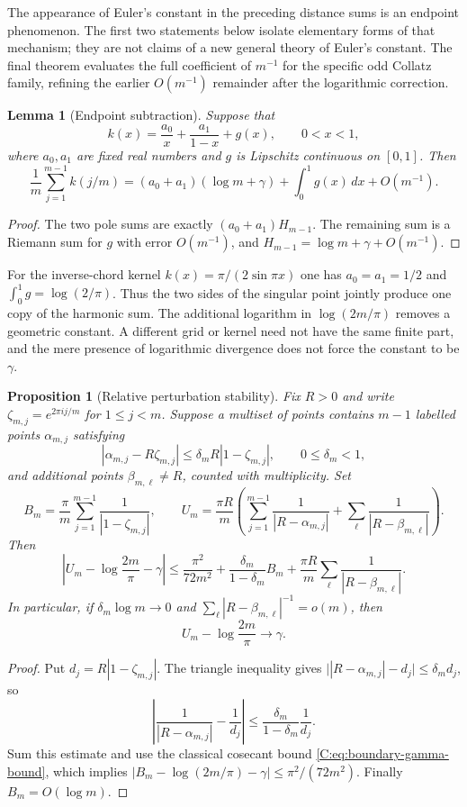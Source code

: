 \documentclass[11pt,a4paper]{article}
\newtheorem{lemma}[theorem]{Lemma}
\newtheorem{proposition}[theorem]{Proposition}
\theoremstyle{definition}
\theoremstyle{remark}
\numberwithin{equation}{section}
\begin{document}
The appearance of Euler's constant in the preceding distance sums is an
endpoint phenomenon.  The first two statements below isolate elementary
forms of that mechanism; they are not claims of a new general theory of
Euler's constant.  The final theorem evaluates the full coefficient of
$m^{-1}$ for the specific odd Collatz family, refining the earlier
$O(m^{-1})$ remainder after the logarithmic correction.

\begin{lemma}[Endpoint subtraction]
\label{C:lem:endpoint-subtraction-general}
Suppose that
\[
 k(x)=\frac{a_0}{x}+\frac{a_1}{1-x}+g(x),\qquad 0<x<1,
\]
where $a_0,a_1$ are fixed real numbers and $g$ is Lipschitz continuous on
$[0,1]$.  Then
\[
 \frac1m\sum_{j=1}^{m-1}k(j/m)
 =(a_0+a_1)(\log m+\gamma)+\int_0^1g(x)\,dx+O(m^{-1}).
\]
\end{lemma}
\begin{proof}
The two pole sums are exactly $(a_0+a_1)H_{m-1}$.  The remaining sum
is a Riemann sum for $g$ with error $O(m^{-1})$, and
$H_{m-1}=\log m+\gamma+O(m^{-1})$.
\end{proof}

For the inverse-chord kernel $k(x)=\pi/(2\sin\pi x)$ one has
$a_0=a_1=1/2$ and $\int_0^1g=\log(2/\pi)$.  Thus the two sides
of the singular point jointly produce one copy of the harmonic sum.
The additional logarithm in $\log(2m/\pi)$ removes a geometric
constant.  A different grid or kernel need not have the same finite
part, and the mere presence of logarithmic divergence does not force
the constant to be $\gamma$.

\begin{proposition}[Relative perturbation stability]
\label{C:prop:gamma-relative-stability}
Fix $R>0$ and write $\zeta_{m,j}=e^{2\pi i j/m}$ for $1\le j<m$.
Suppose a multiset of points contains $m-1$ labelled points
$\alpha_{m,j}$ satisfying
\[
 |\alpha_{m,j}-R\zeta_{m,j}|
 \le \delta_m R|1-\zeta_{m,j}|,
 \qquad 0\le\delta_m<1,
\]
and additional points $\beta_{m,\ell}\ne R$, counted with multiplicity.
Set
\[
 B_m=\frac\pi m\sum_{j=1}^{m-1}\frac1{|1-\zeta_{m,j}|},
 \qquad
 U_m=\frac{\pi R}{m}
 \left(\sum_{j=1}^{m-1}\frac1{|R-\alpha_{m,j}|}
       +\sum_\ell\frac1{|R-\beta_{m,\ell}|}\right).
\]
Then
\[
 \left|U_m-\log\frac{2m}{\pi}-\gamma\right|
 \le \frac{\pi^2}{72m^2}
 +\frac{\delta_m}{1-\delta_m}B_m
 +\frac{\pi R}{m}\sum_\ell\frac1{|R-\beta_{m,\ell}|}.
\]
In particular, if $\delta_m\log m\to0$ and
$\sum_\ell |R-\beta_{m,\ell}|^{-1}=o(m)$, then
\[
 U_m-\log\frac{2m}{\pi}\longrightarrow\gamma.
\]
\end{proposition}
\begin{proof}
Put $d_j=R|1-\zeta_{m,j}|$.  The triangle inequality gives
$\bigl||R-\alpha_{m,j}|-d_j\bigr|\le\delta_m d_j$, so
\[
 \left|\frac1{|R-\alpha_{m,j}|}-\frac1{d_j}\right|
 \le\frac{\delta_m}{1-\delta_m}\frac1{d_j}.
\]
Sum this estimate and use the classical cosecant bound
\eqref{C:eq:boundary-gamma-bound}, which implies
$|B_m-\log(2m/\pi)-\gamma|\le\pi^2/(72m^2)$.
Finally $B_m=O(\log m)$.
\end{proof}
\end{document}
